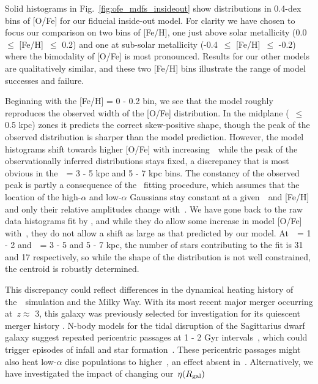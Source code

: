 \documentclass[draft2.tex]{subfiles}
\begin{document}
Solid histograms in Fig.~\ref{fig:ofe_mdfs_insideout} show distributions in 
0.4-dex bins of [O/Fe] for our fiducial inside-out model. 
For clarity we have chosen to focus our comparison on two bins of [Fe/H], one 
just above solar metallicity (0.0~$\leq$ [Fe/H]~$\leq$ 0.2) and one at 
sub-solar metallicity (-0.4~$\leq$ [Fe/H]~$\leq$ -0.2) where the bimodality of 
[O/Fe] is most pronounced. Results for our other models are qualitatively 
similar, and these two [Fe/H] bins illustrate the range of model successes and 
failure. 
\par 
Beginning with the [Fe/H] = 0 - 0.2 bin, we see that the model roughly 
reproduces the observed width of the [O/Fe] distribution. 
In the midplane (\absz~$\leq$ 0.5 kpc) zones it predicts the correct 
skew-positive shape, though the peak of the observed distribution is sharper 
than the model prediction. However, the model histograms shift towards higher 
[O/Fe] with increasing~\absz~while the peak of the observationally inferred 
distributions stays fixed, a discrepancy that is most obvious in the~\rgal~= 
3 - 5 kpc and 5 - 7 kpc bins. The constancy of the observed peak is partly 
a consequence of the~\citet{Vincenzo2021a} fitting procedure, which assumes 
that the location of the high-$\alpha$ and low-$\alpha$ Gaussians stay 
constant at a given~\rgal~and [Fe/H] and only their relative amplitudes change 
with~\absz. We have gone back to the raw data histograms fit by 
\citet{Vincenzo2021a}, and while they do allow some increase in model [O/Fe] 
with~\absz, they do not allow a shift as large as that predicted by our model. 
At~\absz~= 1 - 2 and~\rgal~= 3 - 5 and 5 - 7 kpc, the number of stars 
contributing to the fit is 31 and 17 respectively, so while the shape of the 
distribution is not well constrained, the centroid is robustly determined. 
\par 
This discrepancy could reflect differences in the dynamical heating history 
of the~\hsim~simulation and the Milky Way. 
With its most recent major merger occurring at~$z \approx$ 3, this galaxy was 
previously selected for investigation for its quiescent merger history 
\citep[e.g.][]{Zolotov2012}. N-body models for the tidal disruption of the 
Sagittarius dwarf galaxy suggest repeated pericentric passages at 1 - 2 Gyr 
intervals~\citep{Law2010}, which could trigger episodes of infall and star 
formation~\citep[e.g.][]{RuizLara2020}. 
These pericentric passages might also heat low-$\alpha$ disc populations to 
higher~\absz, an effect absent in~\hsim. 
Alternatively, we have investigated the impact of changing our~$\eta(R_\text{gal})$ 
\end{document}
